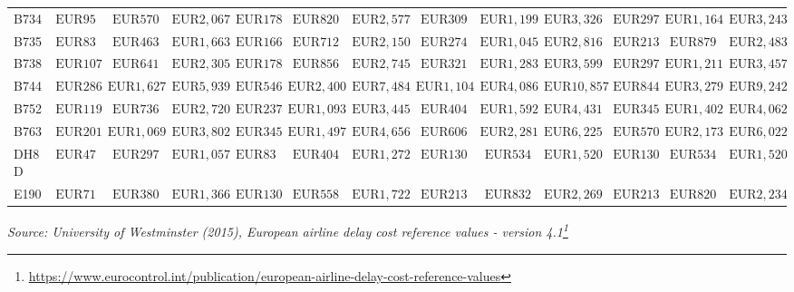 \documentclass[
  11pt,
  a4paper,
]{book}
\DeclareRobustCommand{\href}[2]{#2\footnote{\url{#1}}}
\begin{document}
\begin{longtable}{lrrrrrrrrrrrr}
B734 & $\text{EUR}95$ & $\text{EUR}570$ & $\text{EUR}2,067$ & $\text{EUR}178$ & $\text{EUR}820$ & $\text{EUR}2,577$ & $\text{EUR}309$ & $\text{EUR}1,199$ & $\text{EUR}3,326$ & $\text{EUR}297$ & $\text{EUR}1,164$ & $\text{EUR}3,243$ \\ 
B735 & $\text{EUR}83$ & $\text{EUR}463$ & $\text{EUR}1,663$ & $\text{EUR}166$ & $\text{EUR}712$ & $\text{EUR}2,150$ & $\text{EUR}274$ & $\text{EUR}1,045$ & $\text{EUR}2,816$ & $\text{EUR}213$ & $\text{EUR}879$ & $\text{EUR}2,483$ \\ 
B738 & $\text{EUR}107$ & $\text{EUR}641$ & $\text{EUR}2,305$ & $\text{EUR}178$ & $\text{EUR}856$ & $\text{EUR}2,745$ & $\text{EUR}321$ & $\text{EUR}1,283$ & $\text{EUR}3,599$ & $\text{EUR}297$ & $\text{EUR}1,211$ & $\text{EUR}3,457$ \\ 
B744 & $\text{EUR}286$ & $\text{EUR}1,627$ & $\text{EUR}5,939$ & $\text{EUR}546$ & $\text{EUR}2,400$ & $\text{EUR}7,484$ & $\text{EUR}1,104$ & $\text{EUR}4,086$ & $\text{EUR}10,857$ & $\text{EUR}844$ & $\text{EUR}3,279$ & $\text{EUR}9,242$ \\ 
B752 & $\text{EUR}119$ & $\text{EUR}736$ & $\text{EUR}2,720$ & $\text{EUR}237$ & $\text{EUR}1,093$ & $\text{EUR}3,445$ & $\text{EUR}404$ & $\text{EUR}1,592$ & $\text{EUR}4,431$ & $\text{EUR}345$ & $\text{EUR}1,402$ & $\text{EUR}4,062$ \\ 
B763 & $\text{EUR}201$ & $\text{EUR}1,069$ & $\text{EUR}3,802$ & $\text{EUR}345$ & $\text{EUR}1,497$ & $\text{EUR}4,656$ & $\text{EUR}606$ & $\text{EUR}2,281$ & $\text{EUR}6,225$ & $\text{EUR}570$ & $\text{EUR}2,173$ & $\text{EUR}6,022$ \\ 
DH8D & $\text{EUR}47$ & $\text{EUR}297$ & $\text{EUR}1,057$ & $\text{EUR}83$ & $\text{EUR}404$ & $\text{EUR}1,272$ & $\text{EUR}130$ & $\text{EUR}534$ & $\text{EUR}1,520$ & $\text{EUR}130$ & $\text{EUR}534$ & $\text{EUR}1,520$ \\ 
E190 & $\text{EUR}71$ & $\text{EUR}380$ & $\text{EUR}1,366$ & $\text{EUR}130$ & $\text{EUR}558$ & $\text{EUR}1,722$ & $\text{EUR}213$ & $\text{EUR}832$ & $\text{EUR}2,269$ & $\text{EUR}213$ & $\text{EUR}820$ & $\text{EUR}2,234$ \\ 
\bottomrule
\end{longtable}
\begin{minipage}{\linewidth}
\emph{Source: \href{https://www.eurocontrol.int/publication/european-airline-delay-cost-reference-values}{University of Westminster (2015), European airline delay cost reference values - version 4.1}}\\
\end{minipage}
\end{document}

